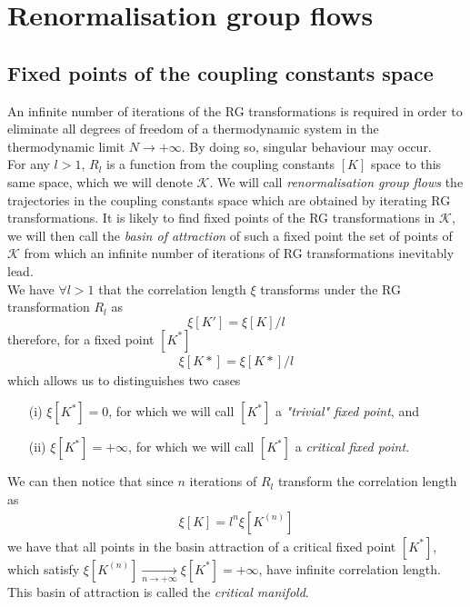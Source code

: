 \documentclass[class=report, float=false, crop=false]{standalone}
\begin{document}
\section{Renormalisation group flows}

\subsection{Fixed points of the coupling constants space}

An infinite number of iterations of the RG transformations is required in order to eliminate all degrees of freedom of a thermodynamic system in the thermodynamic limit $N\rightarrow+\infty$. By doing so, singular behaviour may occur.\\

For any $l>1$, $R_l$ is a function from the coupling constants $[K]$ space to this same space, which we will denote $\mathcal{K}$. We will call \textit{renormalisation group flows} the trajectories in the coupling constants space which are obtained by iterating RG transformations. It is likely to find fixed points of the RG transformations in $\mathcal{K}$, we will then call the \textit{basin of attraction} of such a fixed point the set of points of $\mathcal{K}$ from which an infinite number of iterations of RG transformations inevitably lead.\\

We have $\forall l>1$ that the correlation length $\xi$ transforms under the RG transformation $R_l$ as
\begin{equation}
\xi[K'] = \xi[K]/l
\end{equation}
therefore, for a fixed point $[K^*]$
\begin{align*}
\xi[K*] = \xi[K*]/l
\end{align*}
which allows us to distinguishes two cases
\begin{itemize}
\item[(i)] $\xi[K^*] = 0$, for which we will call $[K^*]$ a \textit{"trivial" fixed point}, and
\item[(ii)] $\xi[K^*] = +\infty$, for which we will call $[K^*]$ a \textit{critical fixed point}.
\end{itemize}
We can then notice that since $n$ iterations of $R_l$ transform the correlation length as
\begin{align*}
\xi[K] = l^n \xi[K^{(n)}]
\end{align*}
we have that all points in the basin attraction of a critical fixed point $[K^*]$, which satisfy $\xi[K^{(n)}] \xrightarrow[n\rightarrow+\infty]{} \xi[K^*] = +\infty$, have infinite correlation length. This basin of attraction is called the \textit{critical manifold}.\\
\end{document}
